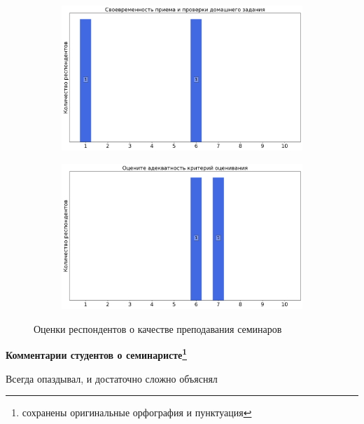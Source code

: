 \begin{figure}[H]
\begin{subfigure}[b]{0.45\textwidth}
                \includegraphics[width=\textwidth]{images/2 course/Компьютерные технологии/seminarists-marks-Пудгородский Ю.А.-2.png}
            \end{subfigure}
            \begin{subfigure}[b]{0.45\textwidth}
                \centering
                \includegraphics[width=\textwidth]{images/2 course/Компьютерные технологии/seminarists-marks-Пудгородский Ю.А.-3.png}
            \end{subfigure}	
            \caption{Оценки респондентов о качестве преподавания семинаров}
        \end{figure}

        \textbf{Комментарии студентов о семинаристе\protect\footnote{сохранены оригинальные орфография и пунктуация}}
            \begin{commentbox} 
                Всегда опаздывал, и достаточно сложно объяснял 
            \end{commentbox}

    
